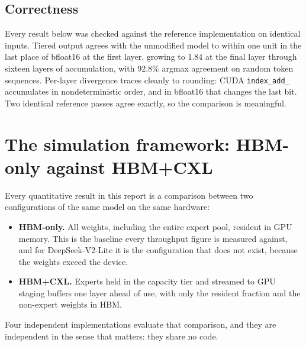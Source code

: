 \documentclass[10pt,a4paper]{article}
\begin{document}
\subsection{Correctness}

Every result below was checked against the reference implementation on identical
inputs. Tiered output agrees with the unmodified model to within one unit in the
last place of bfloat16 at the first layer, growing to 1.84 at the final layer
through sixteen layers of accumulation, with 92.8\% argmax agreement on random
token sequences. Per-layer divergence traces cleanly to rounding: CUDA
\texttt{index\_add\_} accumulates in nondeterministic order, and in bfloat16 that
changes the last bit. Two identical reference passes agree exactly, so the
comparison is meaningful.


\section{The simulation framework: HBM-only against HBM+CXL}
\label{sec:framework}

Every quantitative result in this report is a comparison between two
configurations of the same model on the same hardware:

\begin{itemize}
\item \textbf{HBM-only.} All weights, including the entire expert pool, resident
      in GPU memory. This is the baseline every throughput figure is measured
      against, and for DeepSeek-V2-Lite it is the configuration that does not
      exist, because the weights exceed the device.
\item \textbf{HBM+CXL.} Experts held in the capacity tier and streamed to GPU
      staging buffers one layer ahead of use, with only the resident fraction and
      the non-expert weights in HBM.
\end{itemize}

Four independent implementations evaluate that comparison, and they are
independent in the sense that matters: they share no code.
\end{document}
